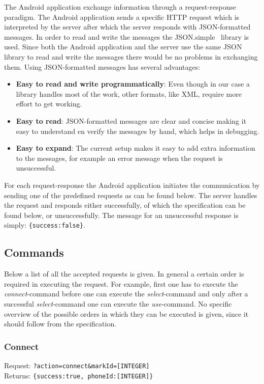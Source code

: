 \documentclass[a4paper,10pt]{article}
\begin{document}
The Android application exchange information through a request-response paradigm.
The Android application sends a specific HTTP request which is interpreted by the server after which the server responds with JSON-formatted messages.
In order to read and write the messages the JSON.simple~\cite{JSONsimple} library is used.
Since both the Android application and the server use the same JSON library to read and write the messages there would be no problems in exchanging them.
Using JSON-formatted messages has several advantages:
\begin{itemize}
	\item
		\textbf{Easy to read and write programmatically}:
		Even though in our case a library handles most of the work, other formats, like XML, require more effort to get working.
	\item
		\textbf{Easy to read}:
		JSON-formatted messages are clear and concise making it easy to understand en verify the messages by hand, which helps in debugging.
	\item
		\textbf{Easy to expand}:
		The current setup makes it easy to add extra information to the messages, for example an error message when the request is unsuccessful.
\end{itemize}

For each request-response the Android application initiates the communication by sending one of the predefined requests as can be found below.
The server handles the request and responds either successfully, of which the specification can be found below, or unsuccessfully.
The message for an unsuccessful response is simply: \texttt{\{success:false\}}.

\subsection{Commands}
Below a list of all the accepted requests is given.
In general a certain order is required in executing the request.
For example, first one has to execute the \emph{connect}-command before one can execute the \emph{select}-command and only after a successful \emph{select}-command one can execute the \emph{use}-command.
No specific overview of the possible orders in which they can be executed is given, since it should follow from the specification.
	
	\subsubsection{Connect}
	Request: \texttt{?action=connect\&markId=[INTEGER]} \\
	Returns: \texttt{\{success:true, phoneId:[INTEGER]\}} \\
\end{document}
